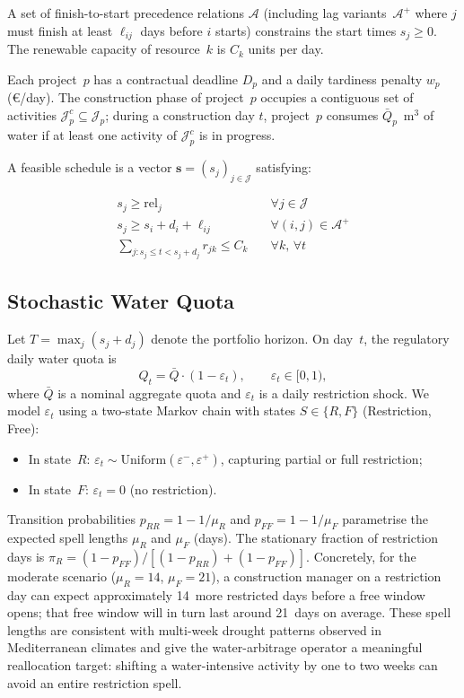 \documentclass[12pt,a4paper]{article}
\newcommand{\eps}{\varepsilon}
\newcommand{\Qbar}{\bar{Q}}
\begin{document}
A set of finish-to-start precedence relations $\mathcal{A}$ (including lag
variants~$\mathcal{A}^+$ where $j$ must finish at least $\ell_{ij}$ days before $i$
starts) constrains the start times $s_j \geq 0$.  The renewable capacity of
resource~$k$ is $C_k$ units per day.

Each project~$p$ has a contractual deadline $D_p$ and a daily tardiness penalty
$w_p$ (\euro{}/day).  The construction phase of project~$p$ occupies a contiguous set of
activities $\mathcal{J}_p^c \subseteq \mathcal{J}_p$; during a construction day
$t$, project~$p$ consumes $\Qbar_p$~m$^3$ of water if at least one activity of
$\mathcal{J}_p^c$ is in progress.

A feasible schedule is a vector $\mathbf{s} = (s_j)_{j \in \mathcal{J}}$ satisfying:

\begin{align}
  s_j \geq \text{rel}_j                    & \quad \forall j \in \mathcal{J}
      \label{eq:rel} \\
  s_j \geq s_i + d_i + \ell_{ij}          & \quad \forall (i,j) \in \mathcal{A}^+
      \label{eq:prec} \\
  \sum_{j: s_j \leq t < s_j + d_j} r_{jk} \leq C_k
      & \quad \forall k,\, \forall t     \label{eq:res}
\end{align}

\subsection{Stochastic Water Quota}
\label{sec:model:water}

Let $T = \max_j (s_j + d_j)$ denote the portfolio horizon.  On day~$t$, the
regulatory daily water quota is
\begin{equation}
  Q_t = \Qbar \cdot (1 - \eps_t), \qquad \eps_t \in [0,1),
  \label{eq:quota}
\end{equation}
where $\Qbar$ is a nominal aggregate quota and $\eps_t$ is a daily restriction
shock.  We model $\eps_t$ using a two-state Markov chain with states
$S \in \{R, F\}$ (Restriction, Free):
\begin{itemize}
  \item In state~$R$: $\eps_t \sim \mathrm{Uniform}(\eps^-,\eps^+)$, capturing
        partial or full restriction;
  \item In state~$F$: $\eps_t = 0$ (no restriction).
\end{itemize}
Transition probabilities $p_{RR} = 1 - 1/\mu_R$ and $p_{FF} = 1 - 1/\mu_F$
parametrise the expected spell lengths $\mu_R$ and $\mu_F$ (days).  The stationary
fraction of restriction days is $\pi_R = (1-p_{FF})/[(1-p_{RR})+(1-p_{FF})]$.
Concretely, for the moderate scenario ($\mu_R = 14$, $\mu_F = 21$), a construction
manager on a restriction day can expect approximately 14~more restricted days before
a free window opens; that free window will in turn last around 21~days on average.
These spell lengths are consistent with multi-week drought patterns observed in
Mediterranean climates and give the water-arbitrage operator a meaningful
reallocation target: shifting a water-intensive activity by one to two weeks can
avoid an entire restriction spell.
\end{document}
